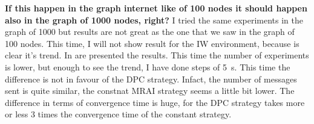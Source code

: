 \documentclass[10pt,conference,letterpaper]{IEEEtran}
\begin{document}
\textbf{If this happen in the graph internet like of 100 nodes it should happen
also in the graph of 1000 nodes, right?}
I tried the same experiments in the graph of \num{1000} but results are not 
great as the one that we saw in the graph of \num{100} nodes.
This time, I will not show result for the IW environment, because is clear it's 
trend.
In  are presented the results. This time
the number of experiments is lower, but enough to see the trend, I have done steps
of \SI{5}{\second}.
This time the difference is not in favour of the \ac{DPC} strategy.
Infact, the number of messages sent is quite similar, the constnat \ac{MRAI}
strategy seems a little bit lower.
The difference in terms of convergence time is huge, for the \ac{DPC} strategy 
takes more or less \num{3} times the convergence time of the constant strategy.
\end{document}
